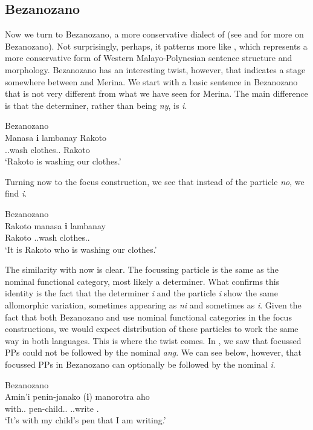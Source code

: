 \documentclass[output=paper]{langsci/langscibook}
\begin{document}
\subsection{Bezanozano}

Now we turn to Bezanozano, a more conservative dialect of  (see
\citealt{Ralalaoherivony:2015} and \citealt{Ranaivoson:2015} for more on
Bezanozano).  Not surprisingly, perhaps, it patterns more like ,
which represents a more conservative form of Western Malayo-Polynesian sentence
structure and morphology. Bezanozano has an interesting twist, however, that
indicates a stage somewhere between  and Merina.  We start with a basic
sentence in Bezanozano that is not very different from what we have seen for
Merina.  The main difference is that the determiner, rather than being
\emph{ny}, is \emph{i}.

\ea Bezanozano\\
    \gll Manasa \textbf{i} lambanay Rakoto \\
    \Prs.\At{}.wash \Det{} clothes.\Fpl.\Excl{} Rakoto \\
    \glt `Rakoto is washing our clothes.'
\z

Turning now to the focus construction, we see that instead of the particle
\emph{no}, we find \emph{i}.

\ea Bezanozano\\
	\gll Rakoto \textbf{} manasa \textbf{i} lambanay\\
    Rakoto \Det{} \Prs.\At{}.wash \Det{} clothes.\Fpl.\Excl{}\\
    \glt `It is Rakoto who is washing our clothes.'
\z

The similarity with  now is clear.  The focussing particle is the
same as the nominal functional category, most likely a determiner.  What
confirms this identity is the fact that the determiner \emph{i} and the
particle \emph{i} show the same allomorphic variation, sometimes appearing as
\emph{ni} and sometimes as \emph{i}.  Given the fact that both Bezanozano and
 use nominal functional categories in the focus constructions, we
would expect distribution of these particles  to work the same way in both
languages.  This is where the twist comes.  In , we saw that
focussed PPs could not be followed by the nominal \emph{ang}.  We can see
below, however, that focussed PPs in Bezanozano can optionally be followed by
the nominal \emph{i}.

\ea Bezanozano\\
	\gll Amin'i penin-janako (\textbf{i}) manorotra aho\\
    with.\Gen{}.\Det{} pen-child.\Fsg.\Gen{} \Det{} \Prs.\At{}.write \Fsg{}.\Nom{}\\
    \glt `It's with my child's pen that I am writing.'
\z
\end{document}

